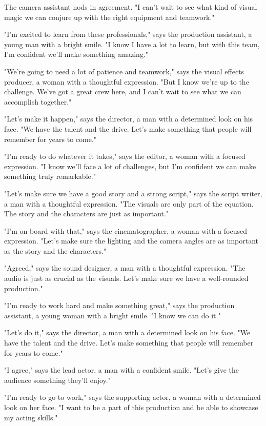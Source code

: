 \documentclass[smalldemyvopaper,11pt,twoside,onecolumn,openright,extrafontsizes]{memoir}
\begin{document}
The camera assistant nods in agreement. "I can't wait to see what kind of visual magic we can conjure up with the right equipment and teamwork."\par
"I'm excited to learn from these professionals," says the production assistant, a young man with a bright smile. "I know I have a lot to learn, but with this team, I'm confident we'll make something amazing."\par
"We're going to need a lot of patience and teamwork," says the visual effects producer, a woman with a thoughtful expression. "But I know we're up to the challenge. We've got a great crew here, and I can't wait to see what we can accomplish together."\par
"Let's make it happen," says the director, a man with a determined look on his face. "We have the talent and the drive. Let's make something that people will remember for years to come."\par
"I'm ready to do whatever it takes," says the editor, a woman with a focused expression. "I know we'll face a lot of challenges, but I'm confident we can make something truly remarkable."\par
"Let's make sure we have a good story and a strong script," says the script writer, a man with a thoughtful expression. "The visuals are only part of the equation. The story and the characters are just as important."\par
"I'm on board with that," says the cinematographer, a woman with a focused expression. "Let's make sure the lighting and the camera angles are as important as the story and the characters."\par
"Agreed," says the sound designer, a man with a thoughtful expression. "The audio is just as crucial as the visuals. Let's make sure we have a well-rounded production."\par
"I'm ready to work hard and make something great," says the production assistant, a young woman with a bright smile. "I know we can do it."\par
"Let's do it," says the director, a man with a determined look on his face. "We have the talent and the drive. Let's make something that people will remember for years to come."\par
"I agree," says the lead actor, a man with a confident smile. "Let's give the audience something they'll enjoy."\par
"I'm ready to go to work," says the supporting actor, a woman with a determined look on her face. "I want to be a part of this production and be able to showcase my acting skills."\par
\end{document}

